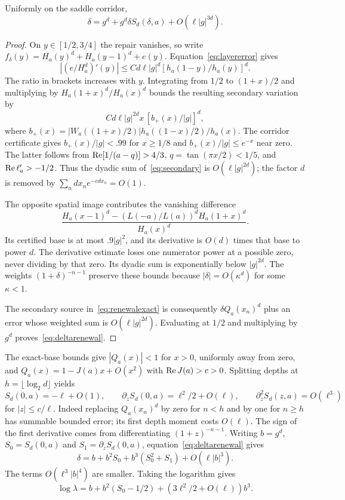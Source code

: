 \documentclass[11pt,a4paper]{article}
\begin{document}
\begin{lemma}\label{lem:scalarrenewal}
Uniformly on the saddle corridor,
\begin{equation}\label{eq:deltarenewal}
 \delta=g^d+g^d\delta S_d(\delta,a)+O(\ell|g|^{3d}).
\end{equation}
\end{lemma}
\begin{proof}
On $y\in[1/2,3/4]$ the repair vanishes, so write
$f_\delta(y)=H_a(y)^d+H_a(y-1)^d+e(y)$.
Equation~\eqref{eq:layererror} gives
\[
 |(e/H_a^d)'(y)|\le Cd\ell|g|^d
       [h_a(1-y)/h_a(y)]^d.
\]
The ratio in brackets increases with $y$. Integrating from $1/2$ to $(1+x)/2$ and multiplying by $H_a(1+x)^d/H_a(x)^d$ bounds the resulting secondary variation by
\begin{equation}\label{eq:secondary}
 Cd\ell|g|^{2d}x\,[b_+(x)/|g|]^d,
\end{equation}
where $b_+(x)=|W_a((1+x)/2)|h_a((1-x)/2)/h_a(x)$.
The corridor certificate gives $b_+(x)/|g|<.99$ for $x\ge1/8$ and $b_+(x)/|g|\le e^{-x}$ near zero. The latter follows from $\operatorname{Re}[1/(a-q)]>4/3$, $q=\tan(\pi x/2)<1/5$, and $\operatorname{Re}\ell_a'>-1/2$. Thus the dyadic sum of~\eqref{eq:secondary} is $O(\ell|g|^{2d})$; the factor $d$ is removed by $\sum_n dx_ne^{-cdx_n}=O(1)$.

The opposite spatial image contributes the vanishing difference
\[
 \frac{H_a(x-1)^d-(L(-a)/L(a))^dH_a(1+x)^d}{H_a(x)^d}.
\]
Its certified base is at most $.9|g|^2$, and its derivative is $O(d)$ times that base to power $d$. The derivative estimate loses one numerator power at a possible zero, never dividing by that zero. Its dyadic sum is exponentially below $|g|^{2d}$. The weights $(1+\delta)^{-n-1}$ preserve these bounds because $|\delta|=O(\kappa^d)$ for some $\kappa<1$.

The secondary source in~\eqref{eq:renewalexact} is consequently
$\delta Q_a(x_n)^d$ plus an error whose weighted sum is $O(\ell|g|^{2d})$. Evaluating at $1/2$ and multiplying by $g^d$ proves~\eqref{eq:deltarenewal}.
\end{proof}
The exact-base bounds give $|Q_a(x)|<1$ for $x>0$, uniformly away from zero, and $Q_a(x)=1-J(a)x+O(x^2)$ with $\operatorname{Re} J(a)>c>0$. Splitting depths at $h=\lfloor\log_2d\rfloor$ yields
\begin{equation}\label{eq:Sjets}
 S_d(0,a)=-\ell+O(1),\qquad
 \partial_zS_d(0,a)=\ell^2/2+O(\ell),\qquad
 \partial_z^2S_d(z,a)=O(\ell^3)
\end{equation}
for $|z|\le c/\ell$. Indeed replacing $Q_a(x_n)^d$ by zero for $n<h$ and by one for $n\ge h$ has summable bounded error; its first depth moment costs $O(\ell)$. The sign of the first derivative comes from differentiating $(1+z)^{-n-1}$.
Writing $b=g^d$, $S_0=S_d(0,a)$ and $S_1=\partial_zS_d(0,a)$, equation~\eqref{eq:deltarenewal} gives
\[
 \delta=b+b^2S_0+b^3(S_0^2+S_1)+O(\ell|b|^3).
\]
The terms $O(\ell^3|b|^4)$ are smaller. Taking the logarithm gives
\begin{equation}\label{eq:local}
 \log\lambda=b+b^2(S_0-1/2)+(3\ell^2/2+O(\ell))b^3.
\end{equation}
\end{document}
